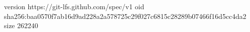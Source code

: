 version https://git-lfs.github.com/spec/v1
oid sha256:baa0570f7ab16d9ad228a2a578725c29f027c6815c28289b07466f16d5cc4da2
size 262240

